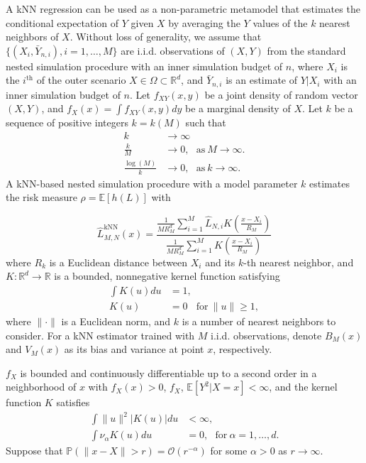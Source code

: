 A kNN regression can be used as a non-parametric metamodel that estimates the conditional expectation of $Y$ given $X$ by averaging the $Y$ values of the $k$ nearest neighbors of $X$.
Without loss of generality, we assume that $\{(X_i, \bar{Y}_{n, i}), i = 1, \dots, M\}$ are i.i.d. observations of $(X, Y)$ from the standard nested simulation procedure with an inner simulation budget of $n$, where $X_i$ is the $i^{\text{th}}$ of the outer scenario $X \in \Omega \subset \mathbb{R}^d$, and $\bar{Y}_{n, i}$ is an estimate of $Y|X_i$ with an inner simulation budget of $n$.
Let $f_{XY}(x, y)$ be a joint density of random vector $(X, Y)$, and $f_X(x) = \int f_{XY}(x, y) dy$ be a marginal density of $X$.
Let $k$ be a sequence of positive integers $k = k(M)$ such that 
\begin{align*}
    k                   & \rightarrow \infty \\
    \frac{k}{M}         & \rightarrow 0, ~~~ \text{as} ~ M \rightarrow \infty. \\
    \frac{\log(M)}{k}   & \rightarrow 0, ~~~ \text{as} ~ k \rightarrow \infty.
\end{align*}
A kNN-based nested simulation procedure with a model parameter $k$ estimates the risk measure $\rho = \mathbb{E} \left[ h(L) \right]$ with

\begin{equation*}
    \hat{L}^{\text{kNN}}_{M, N}(x) 
    = \frac{\frac{1}{M R_M^d} \sum_{i=1}^M \hat{L}_{N, i} K\left(\frac{x - X_i}{R_M}\right)}{\frac{1}{M R_M^d} \sum_{i=1}^M K\left(\frac{x - X_i}{R_M}\right)}
    \end{equation*}
    where $R_k$ is a Euclidean distance between $X_i$ and its $k$-th nearest neighbor, and $K:\mathbb{R}^d \rightarrow \mathbb{R}$ is a bounded, nonnegative kernel function satisfying 
    \begin{align*}
        \int K(u) du & = 1, \\
        K(u) &= 0 ~~~ ~\text{for}~ \|u\| \geq 1,
    \end{align*}
where $\|\cdot\|$ is a Euclidean norm, and $k$ is a number of nearest neighbors to consider.
For a kNN estimator trained with $M$ i.i.d. observations, denote $B_M(x)$ and $V_M(x)$ as its bias and variance at point $x$, respectively.

\begin{assumption} \label{as1:knn}
    $f_X$ is bounded and continuously differentiable up to a second order in a neighborhood of $x$ with $f_X(x) > 0$, $f_X$, $\mathbb{E} \left[ Y^2| X = x \right] < \infty$, and the kernel function $K$ satisfies
    \begin{align*}
        \int \|u\|^2  |K(u)| du & < \infty, \\
        \int \nu_\alpha K(u) du & = 0, ~~~ \text{for}~ \alpha = 1, \dots, d.
    \end{align*}
    Suppose that $\mathbb{P}(\|x - X\| > r) = \mathcal{O}(r^{-\alpha})$ for some $\alpha > 0$ as $r \rightarrow \infty$.
\end{assumption}

